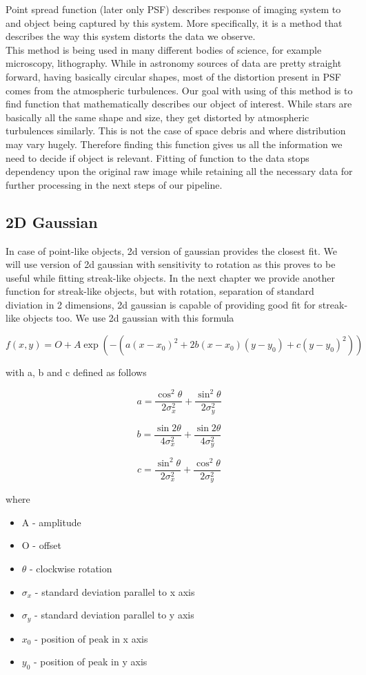 \documentclass[12pt, a4paper, oneside]{book}
\begin{document}
Point spread function (later only PSF) describes response of imaging system to and object being captured by this system.
More specifically, it is a method that describes the way this system distorts the data we observe.\\
This method is being used in many different bodies of science, for example microscopy, lithography.
While in astronomy sources of data are pretty straight forward, having basically circular shapes, most of the distortion present in PSF comes from the atmospheric turbulences.
Our goal with using of this method is to find function that mathematically describes our object of interest.
While stars are basically all the same shape and size, they get distorted by atmospheric turbulences similarly.
This is not the case of space debris and where distribution may vary hugely.
Therefore finding this function gives us all the information we need to decide if object is relevant.
Fitting of function to the data stops dependency upon the original raw image while retaining all the necessary data for further processing in the next steps of our pipeline.

\subsection{2D Gaussian}

In case of point-like objects, 2d version of gaussian provides the closest fit.
We will use version of 2d gaussian with sensitivity to rotation as this proves to be useful while fitting streak-like objects.
In the next chapter we provide another function for streak-like objects, but with rotation, separation of standard diviation in 2 dimensions, 2d gaussian is capable of providing good fit for streak-like objects too.
We use 2d gaussian with this formula

$$ f(x,y) = O + A \exp(-(a(x-x_0)^2 + 2b(x-x_0)(y-y_0) + c(y-y_0)^2)) $$

with a, b and c defined as follows

$$ a = \frac{\cos^2\theta}{2\sigma_x^2} + \frac{\sin^2\theta}{2\sigma_y^2} $$

$$ b = \frac{\sin 2\theta}{4\sigma_x^2} + \frac{\sin 2\theta}{4\sigma_y^2} $$

$$ c = \frac{\sin^2\theta}{2\sigma_x^2} + \frac{\cos^2\theta}{2\sigma_y^2} $$

where

\begin{itemize}
    \item A - amplitude
    \item O - offset
    \item $\theta$ - clockwise rotation
    \item $\sigma_x$ - standard deviation parallel to x axis
    \item $\sigma_y$ - standard deviation parallel to y axis
    \item $x_0$ - position of peak in x axis
    \item $y_0$ - position of peak in y axis
\end{itemize}
\end{document}
